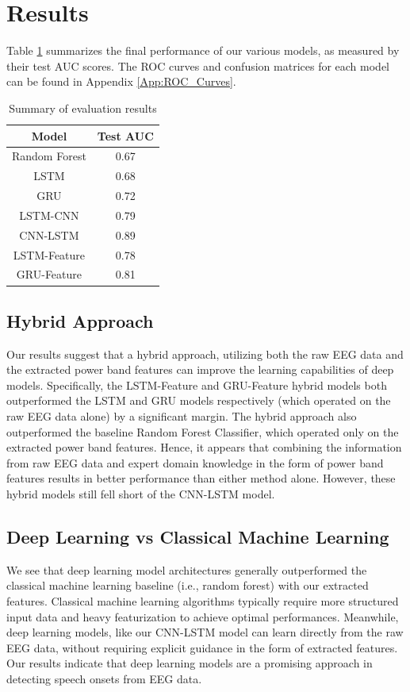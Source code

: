 \documentclass[format=sigconf, nonacm=true, review=false, screen=true]{acmart}
\begin{document}
\section{Results}
Table \ref{tab:result-summary} summarizes the final performance of our various models, as measured by their test AUC scores. The ROC curves and confusion matrices for each model can be found in Appendix \ref{App:ROC_Curves}.
\begin{table}[H]
  \caption{Summary of evaluation results}
  \label{tab:result-summary}
  \begin{tabular}{cc}
    \toprule
    Model & Test AUC\\
    \midrule
    Random Forest & 0.67\\
    LSTM & 0.68\\
    GRU & 0.72\\
    LSTM-CNN & 0.79\\
    CNN-LSTM & 0.89\\
    LSTM-Feature & 0.78\\
    GRU-Feature & 0.81\\
  \bottomrule
\end{tabular}
\end{table}

\subsection{Hybrid Approach}
Our results suggest that a hybrid approach, utilizing both the raw EEG data and the extracted power band features can improve the learning capabilities of deep models. Specifically, the LSTM-Feature and GRU-Feature hybrid models both outperformed the LSTM and GRU models respectively (which operated on the raw EEG data alone) by a significant margin. The hybrid approach also outperformed the baseline Random Forest Classifier, which operated only on the extracted power band features. Hence, it appears that combining the information from raw EEG data and expert domain knowledge in the form of power band features results in better performance than either method alone. However, these hybrid models still fell short of the CNN-LSTM model.

\subsection{Deep Learning vs Classical Machine Learning}
We see that deep learning model architectures generally outperformed the classical machine learning baseline (i.e., random forest) with our extracted features. Classical machine learning algorithms typically require more structured input data and heavy featurization to achieve optimal performances. Meanwhile, deep learning models, like our CNN-LSTM model can learn directly from the raw EEG data, without requiring explicit guidance in the form of extracted features. Our results indicate that deep learning models are a promising approach in detecting speech onsets from EEG data.
\end{document}
